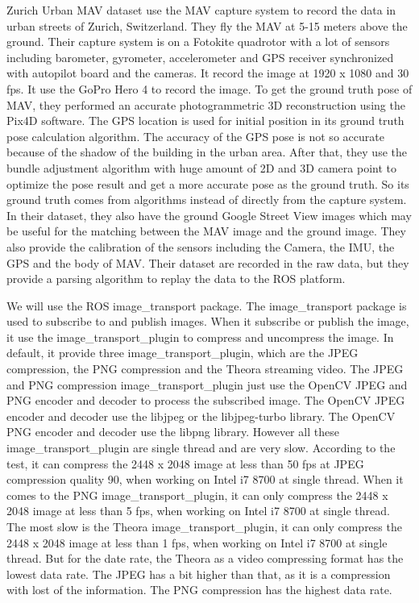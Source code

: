 \documentclass[conference]{IEEEtran}
\begin{document}
	Zurich Urban MAV dataset use the MAV capture system to record the data in urban streets of Zurich, Switzerland. They fly the MAV at 5-15 meters above the ground. Their capture system is on a Fotokite quadrotor with a lot of sensors including barometer, gyrometer, accelerometer and GPS receiver synchronized with autopilot board and the cameras. It record the image at 1920 x 1080 and 30 fps. It use the GoPro Hero 4 to record the image. To get the ground truth pose of MAV, they performed an accurate photogrammetric 3D reconstruction using the Pix4D software. The GPS location is used for initial position in its ground truth pose calculation algorithm. The accuracy of the GPS pose is not so accurate because of the shadow of the building in the urban area. After that, they use the bundle adjustment algorithm with huge amount of 2D and 3D camera point to optimize the pose result and get a more accurate pose as the ground truth. So its ground truth comes from algorithms instead of directly from the capture system. In their dataset, they also have the ground Google Street View images which may be useful for the matching between the MAV image and the ground image. They also provide the calibration of the sensors including the Camera, the IMU, the GPS and the body of MAV. Their dataset are recorded in the raw data, but they provide a parsing algorithm to replay the data to the ROS platform.
	
	We will use the ROS image\_transport package. The image\_transport package is used to subscribe to and publish images. When it subscribe or publish the image, it use the image\_transport\_plugin to compress and uncompress the image. In default, it provide three image\_transport\_plugin, which are the JPEG compression, the PNG compression and the Theora streaming video. The JPEG and PNG compression image\_transport\_plugin just use the OpenCV JPEG and PNG encoder and decoder to process the subscribed image. The OpenCV JPEG encoder and decoder use the libjpeg or the libjpeg-turbo library. The OpenCV PNG encoder and decoder use the libpng library. However all these image\_transport\_plugin are single thread and are very slow. According to the test, it can compress the 2448 x 2048 image at less than 50 fps at JPEG compression quality 90, when working on Intel i7 8700 at single thread. When it comes to the PNG image\_transport\_plugin, it can only compress the 2448 x 2048 image at less than 5 fps, when working on Intel i7 8700 at single thread. The most slow is the Theora image\_transport\_plugin, it can only compress the 2448 x 2048 image at less than 1 fps, when working on Intel i7 8700 at single thread. But for the date rate, the Theora as a video compressing format has the lowest data rate. The JPEG has a bit higher than that, as it is a compression with lost of the information. The PNG compression has the highest data rate.
	
\end{document}
